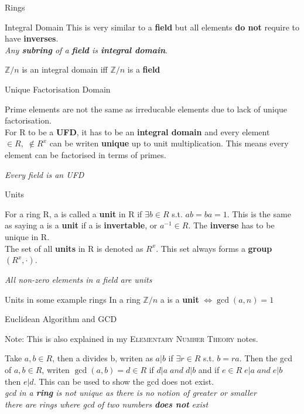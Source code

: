 \documentclass[12pt, letterpaper]{article}
\begin{document}
\begin{section}{Rings}
\begin{subsection}{Integral Domain}
    This is very similar to a \textbf{field} but all elements \textbf{do not}
    require to have \textbf{inverses}. \\
    \emph{Any \textbf{subring} of a \textbf{field} is \textbf{integral domain}}.

    \(\mathbb{Z}/n\) is an integral domain iff \(\mathbb{Z}/n\) is a \textbf{field}

  \end{subsection}

  \begin{subsection}{Unique Factorisation Domain}

    Prime elements are not the same as irreducable elements due to lack of unique
    factorisation. \\
    For R to be a \textbf{UFD}, it has to be an \textbf{integral domain} and
    every element \(\in R, \; \not \in R^{x}\) can be writen \textbf{unique} up
    to unit multiplication. This means every element can be factorised in terms
    of primes.

    \emph{Every field is an UFD}

  \end{subsection}

  \begin{subsection}{Units}

    For a ring R, a is called a \textbf{unit} in R if \(\exists b \in R\) s.t.
    \(ab = ba = 1\). This is the same as saying a is a \textbf{unit} if a is
    \textbf{invertable}, or \(a^{-1} \in R\). The \textbf{inverse} has to be
    unique in R. \\
    The set of all \textbf{units} in R is denoted as \(R^{x}\). This set always
    forms a \textbf{group} \((R^{x}, \cdot)\).

    \emph{All non-zero elements in a field are units}

    \begin{subsubsection}{Units in some example rings}
      In a ring \(\mathbb{Z} / n\) a is a \textbf{unit} \(\iff \gcd(a, n) = 1\)
    \end{subsubsection}

  \end{subsection}

  \begin{subsection}{Euclidean Algorithm and GCD}

    Note: This is also explained in my \textsc{Elementary Number Theory} notes.

    Take \(a, b \in R\), then a divides b, writen as \(a|b\) if \(\exists r \in R\)
    s.t. \(b = ra\). Then the gcd of \(a, b \in R\), writen \(\gcd(a, b) = d \in R\) if
    \(d|a \; and \; d|b\) and if \(e \in R \; e|a \; and \; e|b\) then \(e|d\).
    This can be used to show the gcd does not exist.\\
    \emph{gcd in a \textbf{ring} is not unique as there is no notion of greater or smaller} \\
    \emph{there are rings where gcd of two numbers \textbf{does not} exist} \\


\end{subsection}
\end{section}
\end{document}
